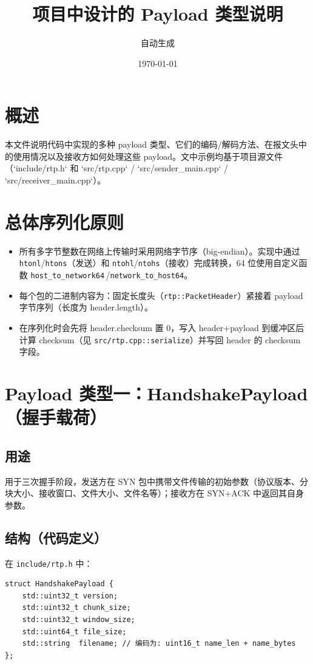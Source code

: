 \documentclass[11pt,a4paper]{article}
\title{项目中设计的 Payload 类型说明}
\author{自动生成}
\date{\today}
\begin{document}
\maketitle

\section{概述}
本文件说明代码中实现的多种 payload 类型、它们的编码/解码方法、在报文头中的使用情况以及接收方如何处理这些 payload。文中示例均基于项目源文件（`include/rtp.h` 和 `src/rtp.cpp` / `src/sender_main.cpp` / `src/receiver_main.cpp`）。

\section{总体序列化原则}
\begin{itemize}
  \item 所有多字节整数在网络上传输时采用网络字节序（big-endian）。实现中通过 \texttt{htonl}/\texttt{htons}（发送）和 \texttt{ntohl}/\texttt{ntohs}（接收）完成转换，64 位使用自定义函数 \texttt{host\_to\_network64}\,/\texttt{network\_to\_host64}。
  \item 每个包的二进制内容为：固定长度头（\texttt{rtp::PacketHeader}）紧接着 payload 字节序列（长度为 header.length）。
  \item 在序列化时会先将 header.checksum 置 0，写入 header+payload 到缓冲区后计算 checksum（见 \texttt{src/rtp.cpp::serialize}）并写回 header 的 checksum 字段。
\end{itemize}

\section{Payload 类型一：HandshakePayload（握手载荷）}
\subsection{用途}
用于三次握手阶段，发送方在 SYN 包中携带文件传输的初始参数（协议版本、分块大小、接收窗口、文件大小、文件名等）；接收方在 SYN+ACK 中返回其自身参数。

\subsection{结构（代码定义）}
在 \texttt{include/rtp.h} 中：
\begin{verbatim}
struct HandshakePayload {
    std::uint32_t version;
    std::uint32_t chunk_size;
    std::uint32_t window_size;
    std::uint64_t file_size;
    std::string  filename; // 编码为: uint16_t name_len + name_bytes
};
\end{verbatim}
\end{document}
